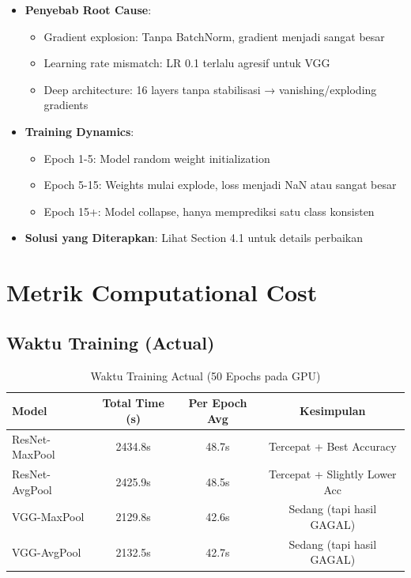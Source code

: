 \documentclass[12pt,a4paper]{report}
\begin{document}
\begin{itemize}
    \item \textbf{Penyebab Root Cause}:
    \begin{itemize}
        \item Gradient explosion: Tanpa BatchNorm, gradient menjadi sangat besar
        \item Learning rate mismatch: LR 0.1 terlalu agresif untuk VGG
        \item Deep architecture: 16 layers tanpa stabilisasi → vanishing/exploding gradients
    \end{itemize}
    
    \item \textbf{Training Dynamics}:
    \begin{itemize}
        \item Epoch 1-5: Model random weight initialization
        \item Epoch 5-15: Weights mulai explode, loss menjadi NaN atau sangat besar
        \item Epoch 15+: Model collapse, hanya memprediksi satu class konsisten
    \end{itemize}
    
    \item \textbf{Solusi yang Diterapkan}: Lihat Section 4.1 untuk details perbaikan
\end{itemize}

\section{Metrik Computational Cost}

\subsection{Waktu Training (Actual)}

\begin{table}[H]
\centering
\caption{Waktu Training Actual (50 Epochs pada GPU)}
\begin{tabular}{|l|c|c|c|}
\hline
\textbf{Model} & \textbf{Total Time (s)} & \textbf{Per Epoch Avg} & \textbf{Kesimpulan} \\
\hline
ResNet-MaxPool & 2434.8s & 48.7s & Tercepat + Best Accuracy \\
\hline
ResNet-AvgPool & 2425.9s & 48.5s & Tercepat + Slightly Lower Acc \\
\hline
VGG-MaxPool & 2129.8s & 42.6s & Sedang (tapi hasil GAGAL) \\
\hline
VGG-AvgPool & 2132.5s & 42.7s & Sedang (tapi hasil GAGAL) \\
\hline
\end{tabular}
\end{table}
\end{document}
